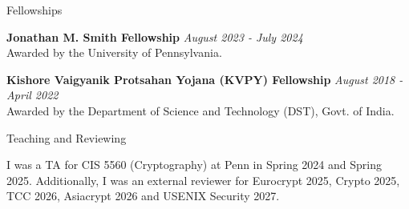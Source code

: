 \documentclass[
	11pt, %
]{resume} %
\begin{document}
\begin{rSection}{Fellowships}

        \textbf{Jonathan M. Smith Fellowship} \hfill \textit{August 2023 - July 2024} \\ 
	Awarded by the University of Pennsylvania.

        \textbf{Kishore Vaigyanik Protsahan Yojana (KVPY) Fellowship} \hfill \textit{August 2018 - April 2022} \\ 
	Awarded by the Department of Science and Technology (DST), Govt. of India.

\end{rSection}


\begin{rSection}{Teaching and Reviewing}

    I was a TA for CIS 5560 (Cryptography) at Penn in Spring 2024 and Spring 2025. Additionally, I was an external reviewer for Eurocrypt 2025, Crypto 2025, TCC 2026, Asiacrypt 2026 and USENIX Security 2027.

\end{rSection}





\end{document}
